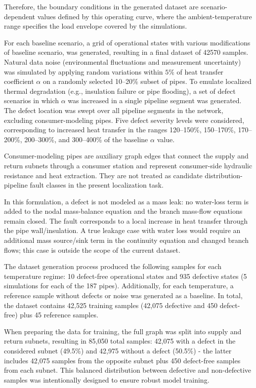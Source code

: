\documentclass[energies,article,submit,pdftex,moreauthors]{Definitions/mdpi}
\newif\ifshowrevisions
\newcommand{\revisionstyle}[1]{\textcolor{blue}{#1}}
\newcommand{\revision}[1]{\ifshowrevisions\revisionstyle{#1}\else#1\fi}
\begin{document}
Therefore, the boundary conditions in the generated dataset
are scenario-dependent values defined by this operating curve, where the ambient-temperature range specifies the load
envelope covered by the simulations.

For each baseline scenario, a grid of operational states with various
modifications of baseline scenario, was generated, resulting in a final dataset
of 42570 samples. Natural data noise (environmental fluctuations and
measurement uncertainty) was simulated by applying random variations within
$5\%$ of heat transfer coefficient $\alpha$ on a randomly selected 10--20\%
subset of pipes. To emulate localized thermal degradation (e.g., insulation
failure or pipe flooding), a set of defect scenarios in which $\alpha$ was
increased in a single pipeline segment was generated. The defect location was
swept over all pipeline segments in the network, excluding consumer-modeling
pipes. Five defect severity levels were considered, corresponding to
increased heat transfer in the ranges 120--150\%, 150--170\%,
170--200\%, 200--300\%, and 300--400\% of the baseline $\alpha$ value.

Consumer-modeling pipes are auxiliary graph edges that
connect the supply and return subnets through a consumer station and represent
consumer-side hydraulic resistance and heat extraction. They are not treated as
candidate distribution-pipeline fault classes in the present localization
task.

In this formulation, a defect is not modeled as a mass leak:
	no water-loss term is added to the nodal mass-balance equation and the branch
	mass-flow equations remain closed. The fault corresponds to a local increase
	in heat transfer through the pipe wall/insulation. A true leakage case with
	water loss would require an additional mass source/sink term in the continuity
	equation and changed branch flows; this case is outside the scope of the
	current dataset.

The dataset generation process produced the following samples for each temperature regime: 10 defect-free operational states and 935 defective states (5 simulations for each of the 187 pipes). Additionally, for each temperature, a reference sample without defects or noise was generated as a baseline. In total, the dataset contains 42,525 training samples (42,075 defective and 450 defect-free) plus 45 reference samples.

When preparing the data for training, the full graph was split into supply and return subnets, resulting in 85,050 total samples: 42,075 with a defect in the considered subnet (49.5\%) and 42,975 without a defect (50.5\%) - the latter includes 42,075 samples from the opposite subnet plus 450 defect-free samples from each subnet. This balanced distribution between defective and non-defective samples was intentionally designed to ensure robust model training.
\end{document}
